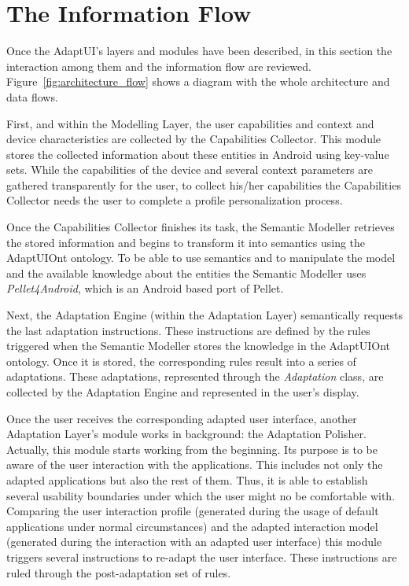 \section{The Information Flow}
\label{sec:architecture_flow}

Once the AdaptUI's layers and modules have been described, in this section the 
interaction among them and the information flow are reviewed.
Figure~\ref{fig:architecture_flow} shows a diagram with the whole architecture
and data flows.

First, and within the Modelling Layer, the user capabilities and context and
device characteristics are collected by the Capabilities Collector. This module
stores the collected information about these entities in Android using key-value
sets. While the capabilities of the device and several context parameters are
gathered transparently for the user, to collect his/her capabilities the
Capabilities Collector needs the user to complete a profile personalization process.

Once the Capabilities Collector finishes its task, the Semantic Modeller retrieves
the stored information and begins to transform it into semantics using the
AdaptUIOnt ontology. To be able to use semantics and to manipulate the model
and the available knowledge about the entities the Semantic Modeller uses
\textit{Pellet4Android}, which is an Android based port of Pellet.

Next, the Adaptation Engine (within the Adaptation Layer) semantically requests
the last adaptation instructions. These instructions are defined by the rules
triggered when the Semantic Modeller stores the knowledge in the AdaptUIOnt
ontology. Once it is stored, the corresponding rules result into a series of
adaptations. These adaptations, represented through the \textit{Adaptation}
class, are collected by the Adaptation Engine and represented in the user's display.

Once the user receives the corresponding adapted user interface, another Adaptation
Layer's module works in background: the Adaptation Polisher. Actually, this module
starts working from the beginning. Its purpose is to be aware of the user interaction
with the applications. This includes not only the adapted applications but also
the rest of them. Thus, it is able to establish several usability boundaries
under which the user might no be comfortable with. Comparing the user interaction
profile (generated during the usage of default applications under normal
circumstances) and the adapted interaction model (generated during the interaction
with an adapted user interface) this module triggers several instructions to
re-adapt the user interface. These instructions are ruled through the
post-adaptation set of rules.

